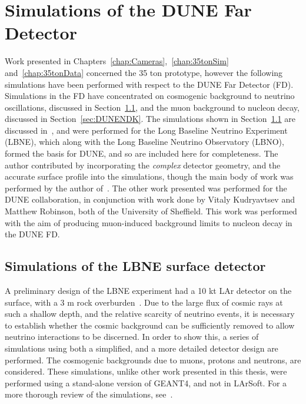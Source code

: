 

\chapter{Simulations of the DUNE Far Detector} \label{chap:FDSims} %
\graphicspath{{FarDetectorSimulations/Figs/Raster/}{FarDetectorSimulations/Figs/PDF/}{FarDetectorSimulations/Figs/Vector/}}

Work presented in Chapters~\ref{chap:Cameras},~\ref{chap:35tonSim} and~\ref{chap:35tonData} concerned the 35 ton prototype, however the following simulations have been performed with respect to the DUNE Far Detector (FD). Simulations in the FD have concentrated on cosmogenic background to neutrino oscillations, discussed in Section~\ref{sec:LBNESurf}, and the muon background to nucleon decay, discussed in Section~\ref{sec:DUNENDK}. The simulations shown in Section~\ref{sec:LBNESurf} are discussed in~\citep{MartinsThesis}, and were performed for the Long Baseline Neutrino Experiment (LBNE), which along with the Long Baseline Neutrino Observatory (LBNO), formed the basis for DUNE, and so are included here for completeness. The author contributed by incorporating the \emph{complex} detector geometry, and the accurate surface profile into the simulations, though the main body of work was performed by the author of~\citep{MartinsThesis}. The other work presented was performed for the DUNE collaboration, in conjunction with work done by Vitaly Kudryavtsev and Matthew Robinson, both of the University of Sheffield. This work was performed with the aim of producing muon-induced background limits to nucleon decay in the DUNE FD. \\

\section{Simulations of the LBNE surface detector} \label{sec:LBNESurf} %
A preliminary design of the LBNE experiment had a 10 kt LAr detector on the surface, with a 3 m rock overburden~\citep{LBNE6493}. Due to the large flux of cosmic rays at such a shallow depth, and the relative scarcity of neutrino events, it is necessary to establish whether the cosmic background can be sufficiently removed to allow neutrino interactions to be discerned. In order to show this, a series of simulations using both a simplified, and a more detailed detector design are performed. The cosmogenic backgrounds due to muons, protons and neutrons, are considered. These simulations, unlike other work presented in this thesis, were performed using a stand-alone version of GEANT4, and not in LArSoft. For a more thorough review of the simulations, see~\citep{MartinsThesis}. \\

